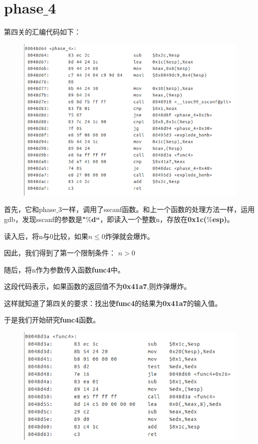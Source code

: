\section{phase$\_$4}
	第四关的汇编代码如下：
	\begin{figure}[h]
		\centering
			\includegraphics[scale=0.77]{images/phase_4.png}
	\end{figure}
	
	首先，它和phase$\_$3一样，调用了sscanf函数。和上一个函数的处理方法一样，运用gdb，发现sscanf的参数是\textbf{"$\%$d“}，即读入一个整数n，存放在\textbf{0x1c($\%$esp)}。
	
	读入后，将n与0比较，如果$n \le 0$炸弹就会爆炸。
	
	因此，我们得到了第一个限制条件： $n > 0$
	
	随后，将n作为参数传入函数\textbf{func4}中。
	
	
	这段代码表示，如果函数的返回值不为\textbf{0x41a7},则炸弹爆炸。
	
	这样就知道了第四关的要求：找出使\textbf{func4}的结果为\textbf{0x41a7}的输入值。
	
	于是我们开始研究\textbf{func4}函数。
	
	\begin{figure}[h]
		\centering
			\includegraphics[scale=0.77]{images/fun_4.png}
	\end{figure}
	
